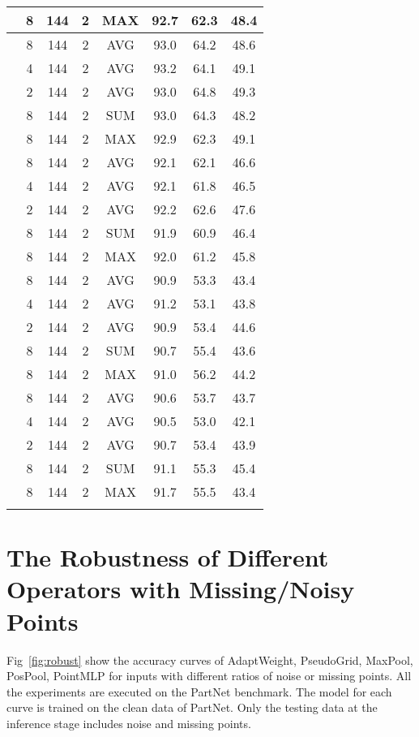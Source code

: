 \documentclass[runningheads]{llncs}
\begin{document}
\begin{small}
\begin{table}[t]
\begin{tabular}{c|c|c|c|c|c|c|c}
			& 8 &144&2& MAX & 92.7 & 62.3 & 48.4 \\
			\hline
			\multirow{5}{*}{} & 8 &144&2& AVG & 93.0 & 64.2 & 48.6 \\
			& 4 &144&2& AVG & 93.2 & 64.1 & 49.1 \\
			& 2 &144&2& AVG & 93.0 & 64.8 & 49.3 \\
			& 8 &144&2& SUM & 93.0 & 64.3 & 48.2 \\
			& 8 &144&2& MAX & 92.9 & 62.3 & 49.1 \\
			\hline
			\multirow{5}{*}{} & 8 &144&2& AVG &92.1 &62.1  &46.6 \\
			& 4 &144&2& AVG &92.1 & 61.8 &  46.5\\
			& 2 &144&2& AVG &  92.2&  62.6& 47.6 \\
			& 8 &144&2& SUM & 91.9 &  60.9& 46.4 \\
			& 8 &144&2& MAX & 92.0 &  61.2&  45.8\\
			\hline
			\multirow{5}{*}{} & 8 &144&2 & AVG & 90.9& 53.3&  43.4\\
			& 4 &144&2& AVG &  91.2& 53.1&  43.8\\
			& 2 &144&2& AVG &  90.9&  53.4&  44.6\\
			& 8 &144&2& SUM &  90.7&  55.4&43.6  \\
			& 8 &144&2& MAX &  91.0& 56.2 &44.2  \\
			\hline
			\multirow{5}{*}{} & 8 &144&2& AVG & 90.6&53.7 &  43.7\\
			& 4 &144&2& AVG &  90.5& 53.0&  42.1\\
			& 2 &144&2& AVG &  90.7&  53.4 &  43.9\\
			& 8 &144&2& SUM &  91.1&  55.3& 45.4 \\
			& 8 &144&2& MAX & 91.7 &  55.5&43.4  \\
			\Xhline{1.0pt}
		\end{tabular}
		\vspace{-2em}
	\end{table}
\end{small}

\section{The Robustness of Different Operators with Missing/Noisy Points}
Fig~\ref{fig:robust} show the accuracy curves of AdaptWeight, PseudoGrid, MaxPool, PosPool, PointMLP for inputs with different ratios of noise or missing points. All the experiments are executed on the PartNet benchmark. The model for each curve is trained on the clean data of PartNet. Only the testing data at the inference stage includes noise and missing points.
\end{document}

